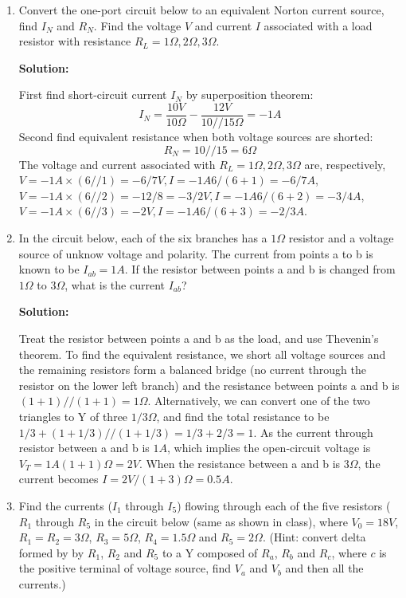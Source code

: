 \begin{enumerate}
\item Convert the one-port circuit below to an equivalent Norton current
source, find $I_N$ and $R_N$. Find the voltage $V$ and current $I$ associated
with a load resistor with resistance $R_L=1\Omega, 2\Omega, 3\Omega$.


{\bf Solution:}

First find short-circuit current $I_N$ by superposition theorem:
\[ I_N=\frac{10V}{10\Omega}-\frac{12V}{10//15 \Omega}=-1A \]
Second find equivalent resistance when both voltage sources are shorted:
\[ R_N=10//15=6\Omega \]
The voltage and current associated with $R_L=1\Omega, 2\Omega, 3\Omega$ are, 
respectively, 
$V=-1A\times(6//1)=-6/7V, I=-1A 6/(6+1)=-6/7A$,
$V=-1A\times(6//2)=-12/8=-3/2V, I=-1A 6/(6+2)=-3/4A$,
$V=-1A\times(6//3)=-2V, I=-1A 6/(6+3)=-2/3A$.

\item In the circuit below, each of the six branches has a $1\Omega$
resistor and a voltage source of unknow voltage and polarity. The current
from points a to b is known to be $I_{ab}=1A$. If the resistor between 
points a and b is changed from $1\Omega$ to $3\Omega$, what is the current
$I_{ab}$?


{\bf Solution:}

Treat the resistor between points a and b as the load, and use Thevenin's 
theorem. To find the equivalent resistance, we short all voltage sources
and the remaining resistors form a balanced bridge (no current through the
resistor on the lower left branch) and the resistance between points a and
b is $(1+1)//(1+1)=1\Omega$. Alternatively, we can convert one of the two
triangles to Y of three $ 1/3 \Omega$, and find the total resistance to be 
$1/3+(1+1/3)//(1+1/3)=1/3+2/3=1$. As the current through resistor between a
and b is $1A$, which implies the open-circuit voltage is $V_T=1A (1+1)
\Omega=2V$. When the resistance between a and b is $3\Omega$, the current 
becomes $I=2V/(1+3)\Omega=0.5A$.

\item Find the currents ($I_1$ through $I_5$) flowing through each of the 
five resistors ($R_1$ through $R_5$ in the circuit below (same as shown in
class), where $V_0=18V$, $R_1=R_2=3\Omega$, $R_3=5\Omega$, $R_4=1.5\Omega$
and $R_5=2\Omega$. (Hint: convert delta formed by by $R_1$, $R_2$ and $R_5$
to a Y composed of $R_a$, $R_b$ and $R_c$, where $c$ is the positive 
terminal of voltage source, find $V_a$ and $V_b$ and then all the currents.)


\end{enumerate}
